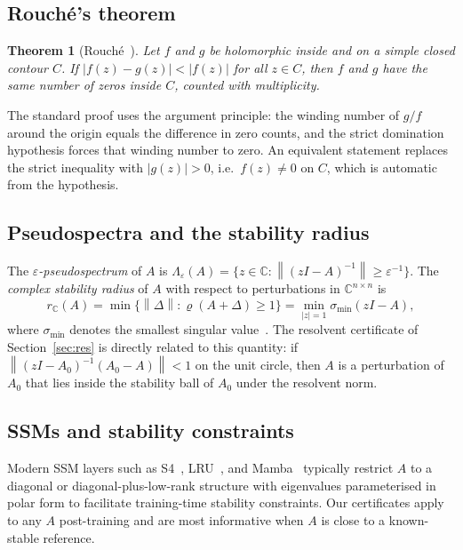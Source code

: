 \documentclass{article}
\newtheorem{theorem}{Theorem}
\theoremstyle{definition}
\newcommand{\C}{\mathbb{C}}
\newcommand{\norm}[1]{\left\|#1\right\|}
\newcommand{\abs}[1]{\left|#1\right|}
\begin{document}
\subsection{Rouch\'e's theorem}

\begin{theorem}[Rouch\'e~\cite{ahlfors1979complex}]
\label{thm:rouche_classical}
Let $f$ and $g$ be holomorphic inside and on a simple closed contour $C$.
If $\abs{f(z) - g(z)} < \abs{f(z)}$ for all $z \in C$, then $f$ and $g$
have the same number of zeros inside $C$, counted with multiplicity.
\end{theorem}

The standard proof uses the argument principle: the winding number of $g/f$
around the origin equals the difference in zero counts, and the strict
domination hypothesis forces that winding number to zero.  An equivalent
statement replaces the strict inequality with $\abs{g(z)} > 0$, i.e.\
$f(z) \neq 0$ on $C$, which is automatic from the hypothesis.

\subsection{Pseudospectra and the stability radius}

The \emph{$\varepsilon$-pseudospectrum} of $A$ is
$\Lambda_\varepsilon(A) = \{z \in \C : \norm{(zI-A)^{-1}} \geq
\varepsilon^{-1}\}$.  The \emph{complex stability radius} of $A$ with
respect to perturbations in $\C^{n\times n}$ is
\[
  r_{\C}(A) = \min\{\norm{\Delta} : \varrho(A + \Delta) \geq 1\}
  = \min_{|z|=1} \sigma_{\min}(zI - A),
\]
where $\sigma_{\min}$ denotes the smallest singular value~\cite{hinrichsen1986stability,trefethen2005spectra}.
The resolvent certificate of Section~\ref{sec:res} is directly related to
this quantity: if $\norm{(zI-A_0)^{-1}(A_0 - A)} < 1$ on the unit circle,
then $A$ is a perturbation of $A_0$ that lies inside the stability ball of
$A_0$ under the resolvent norm.

\subsection{SSMs and stability constraints}

Modern SSM layers such as S4~\cite{gu2022s4}, LRU~\cite{smith2023lru}, and
Mamba~\cite{gu2023mamba} typically restrict $A$ to a diagonal or diagonal-plus-low-rank
structure with eigenvalues parameterised in polar form to facilitate
training-time stability constraints.  Our certificates apply to any $A$
post-training and are most informative when $A$ is close to a known-stable
reference.
\end{document}
